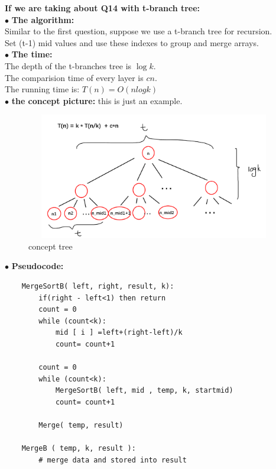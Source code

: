 \documentclass[12pt,a4paper]{article}
\begin{document}
\noindent
\textbf{If we are taking about Q14 with t-branch tree:}\\
$\bullet$ \textbf{The algorithm:}\\
Similar to the first question, suppose we use a t-branch tree for recursion.\\
Set (t-1) mid values and use these indexes to group and merge arrays.\\
$\bullet$ \textbf{The time:}\\
The depth of the t-branches tree is $\log{k}$.\\
The comparision time of every layer is $cn$.\\
The running time is: $T(n) =  O(nlogk)$\\
$\bullet$ \textbf{the concept picture:} this is just an example.
	\begin{figure}[H]
	\centering %
	\includegraphics[height=5.5cm,width=12.5cm]{picture//Q14B2.png}
	\caption{concept tree}
	\end{figure}
$\bullet$ \textbf{Pseudocode:}
	\begin{lstlisting}
	MergeSortB( left, right, result, k):
		if(right - left<1) then return
		count = 0
		while (count<k):
			mid [ i ] =left+(right-left)/k
			count= count+1
		
		count = 0
		while (count<k):
			MergeSortB( left, mid , temp, k, startmid)
			count= count+1
	
		Merge( temp, result)
	
	MergeB ( temp, k, result ):
		# merge data and stored into result
	\end{lstlisting}
\end{document}
